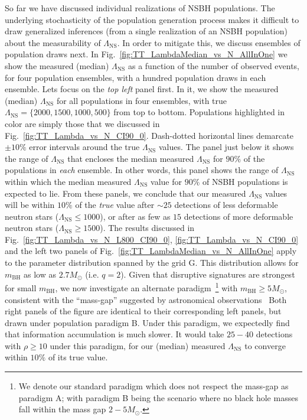 \documentclass[aps,prd,amsmath,floats,floatfix, twocolumn,
superscriptaddress,nofootinbib,showpacs]{revtex4-1}
\newcommand{\lambdans}{\Lambda_\mathrm{NS}}
\newcommand{\mbh}{m_\mathrm{BH}}
\begin{document}
So far we have discussed individual realizations of NSBH populations. The 
underlying stochasticity of the population generation process makes it
difficult to draw generalized inferences (from a single realization of an
NSBH population) about the measurability of $\lambdans$. In order to mitigate
this, we discuss ensembles of population draws next. In
Fig.~\ref{fig:TT_LambdaMedian_vs_N_AllInOne} we show the measured
({median}) $\lambdans$ as a function of the number of observed
events, for four population ensembles, with a hundred population draws
in each ensemble. Lets focus on the {\it top left} panel first. In it, we
show the measured (median) $\lambdans$ for all populations in four ensembles,
with true $\lambdans=\{2000,1500,1000,500\}$ from top to bottom.
Populations highlighted in color are simply those that we discussed in
Fig.~\ref{fig:TT_Lambda_vs_N_CI90_0}. Dash-dotted horizontal lines
demarcate $\pm10\%$ error intervals around the true $\lambdans$ values.
The panel just below it shows the range of $\lambdans$ that encloses the
median measured $\lambdans$ for $90\%$ of the populations in {\it each}
ensemble. In other words, this panel shows the range of $\lambdans$ within which
the median measured $\lambdans$ value for $90\%$ of NSBH populations is
expected to lie. From these panels, we conclude that our measured $\lambdans$
values will be within $10\%$ of the {\it true} value after $\sim 25$
detections of less deformable neutron stars ($\lambdans\leq 1000$), or
after as few as $15$ detections of more deformable neutron stars
($\lambdans\geq 1500$).
% 
The results discussed in Fig.~\ref{fig:TT_Lambda_vs_N_L800_CI90_0},
\ref{fig:TT_Lambda_vs_N_CI90_0} and the left two panels
of Fig.~\ref{fig:TT_LambdaMedian_vs_N_AllInOne} apply to the parameter
distribution spanned by the grid G. This distribution allows for $\mbh$
as low as $2.7M_\odot$ (i.e. $q=2$).
Given that disruptive signatures are strongest for small $\mbh$, we now
investigate an alternate paradigm~\footnote{We denote our standard paradigm
which does not respect the mass-gap as paradigm A; with paradigm B being
the scenario where no black hole masses fall within the mass gap $2-5M_\odot$.}
with $\mbh\geq 5M_\odot$, consistent
with the ``mass-gap'' suggested by astronomical observations~\cite{Bailyn:1997xt,
Kalogera:1996ci,Kreidberg:2012,Littenberg:2015tpa}
% 
Both right panels of the figure are identical to their corresponding left
panels, but drawn under population paradigm B. Under this paradigm, we
expectedly find that information accumulation is much slower. It would
take $25-40$ detections with $\rho\geq10$ under this paradigm, for our (median)
measured $\lambdans$ to converge within $10\%$ of its true value.
\end{document}
